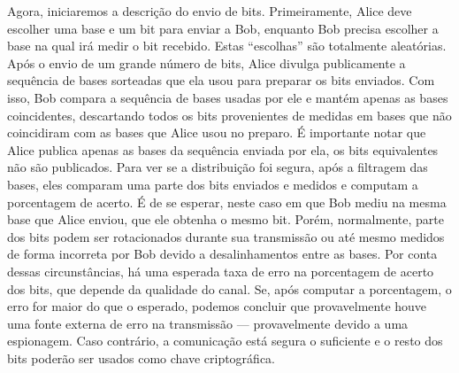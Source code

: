 \documentclass[pra, twocolumn]{revtex4}
\begin{document}
Agora, iniciaremos a descri\c c\~ao do envio de bits. Primeiramente, Alice deve escolher uma base e um bit para enviar a Bob, enquanto Bob precisa escolher a base na qual ir\'a medir o bit recebido. Estas ``escolhas'' s\~ao totalmente aleat\'orias. Ap\'os o envio de um grande n\'umero de bits, Alice divulga publicamente a sequ\^encia de bases sorteadas que ela usou para preparar os bits enviados. Com isso, Bob compara a sequ\^encia de bases usadas por ele e mant\'em apenas as bases coincidentes, descartando todos os bits provenientes de medidas em bases que  n\~ao coincidiram com as bases que Alice usou no preparo. \'E importante notar que Alice publica apenas as bases da sequ\^encia enviada por ela, os bits equivalentes n\~ao s\~ao publicados. Para ver se a distribui\c c\~ao foi segura, ap\'os a filtragem das bases, eles comparam uma parte dos bits enviados e medidos e computam a porcentagem de acerto. \'E de se esperar, neste caso em que Bob mediu na mesma base que Alice enviou, que ele obtenha o mesmo bit. Por\'em, normalmente, parte dos bits podem ser rotacionados durante sua transmiss\~ao ou at\'e mesmo medidos de forma incorreta por Bob devido a desalinhamentos entre as bases. Por conta dessas circunst\^ancias, h\'a uma esperada taxa de erro na porcentagem de acerto dos bits, que depende da qualidade do canal. Se, ap\'os computar a porcentagem, o erro for maior do que o esperado, podemos concluir que provavelmente houve uma fonte externa de erro na transmiss\~ao --- provavelmente devido a uma espionagem. Caso contr\'ario, a comunica\c c\~ao est\'a segura o suficiente e o resto dos bits poder\~ao ser usados como chave criptogr\'afica.
\end{document}
